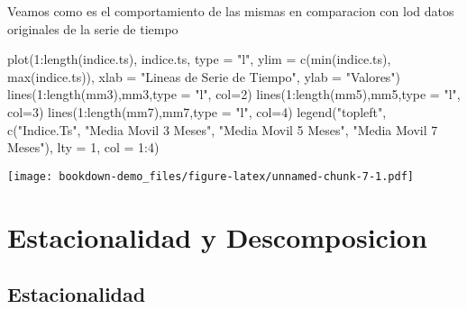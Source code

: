\documentclass[
]{book}
\newenvironment{Shaded}{\begin{snugshade}}{\end{snugshade}}
\newcommand{\AttributeTok}[1]{\textcolor[rgb]{0.77,0.63,0.00}{#1}}
\newcommand{\DecValTok}[1]{\textcolor[rgb]{0.00,0.00,0.81}{#1}}
\newcommand{\FunctionTok}[1]{\textcolor[rgb]{0.00,0.00,0.00}{#1}}
\newcommand{\NormalTok}[1]{#1}
\newcommand{\SpecialCharTok}[1]{\textcolor[rgb]{0.00,0.00,0.00}{#1}}
\newcommand{\StringTok}[1]{\textcolor[rgb]{0.31,0.60,0.02}{#1}}
\begin{document}
Veamos como es el comportamiento de las mismas en comparacion con lod datos originales de la serie de tiempo

\begin{Shaded}
\begin{Highlighting}[]
\FunctionTok{plot}\NormalTok{(}\DecValTok{1}\SpecialCharTok{:}\FunctionTok{length}\NormalTok{(indice.ts), indice.ts, }\AttributeTok{type =} \StringTok{"l"}\NormalTok{,   }
     \AttributeTok{ylim =} \FunctionTok{c}\NormalTok{(}\FunctionTok{min}\NormalTok{(indice.ts), }\FunctionTok{max}\NormalTok{(indice.ts)),}
     \AttributeTok{xlab =} \StringTok{"Lineas de Serie de Tiempo"}\NormalTok{, }\AttributeTok{ylab =} \StringTok{"Valores"}\NormalTok{)}
\FunctionTok{lines}\NormalTok{(}\DecValTok{1}\SpecialCharTok{:}\FunctionTok{length}\NormalTok{(mm3),mm3,}\AttributeTok{type =} \StringTok{"l"}\NormalTok{, }\AttributeTok{col=}\DecValTok{2}\NormalTok{)}
\FunctionTok{lines}\NormalTok{(}\DecValTok{1}\SpecialCharTok{:}\FunctionTok{length}\NormalTok{(mm5),mm5,}\AttributeTok{type =} \StringTok{"l"}\NormalTok{, }\AttributeTok{col=}\DecValTok{3}\NormalTok{)}
\FunctionTok{lines}\NormalTok{(}\DecValTok{1}\SpecialCharTok{:}\FunctionTok{length}\NormalTok{(mm7),mm7,}\AttributeTok{type =} \StringTok{"l"}\NormalTok{, }\AttributeTok{col=}\DecValTok{4}\NormalTok{)}
\FunctionTok{legend}\NormalTok{(}\StringTok{"topleft"}\NormalTok{,}
       \FunctionTok{c}\NormalTok{(}\StringTok{"Indice.Ts"}\NormalTok{, }\StringTok{"Media Movil 3 Meses"}\NormalTok{, }\StringTok{"Media Movil 5 Meses"}\NormalTok{, }\StringTok{"Media Movil 7 Meses"}\NormalTok{),}
       \AttributeTok{lty =} \DecValTok{1}\NormalTok{, }\AttributeTok{col =} \DecValTok{1}\SpecialCharTok{:}\DecValTok{4}\NormalTok{)}
\end{Highlighting}
\end{Shaded}

\texttt{[image: bookdown-demo\_files/figure-latex/unnamed-chunk-7-1.pdf]}

\hypertarget{estacionalidad-y-descomposicion}{%
\chapter{Estacionalidad y Descomposicion}\label{estacionalidad-y-descomposicion}}

\hypertarget{Estacion}{%
\section{Estacionalidad}\label{Estacion}}
\end{document}
